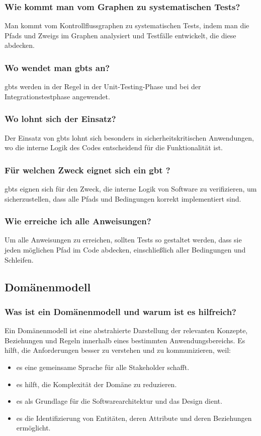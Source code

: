 \documentclass[main.tex]{subfiles}
\begin{document}
\subsubsection*{Wie kommt man vom Graphen zu systematischen Tests?}
Man kommt vom Kontrollflussgraphen zu systematischen Tests, indem man die \glspl{Pfad} und \glspl{Zweig} im Graphen analysiert und Testfälle entwickelt, die diese abdecken.


\subsubsection*{Wo wendet man \glspl{gbt}  an?}
\glspl{gbt}  werden in der Regel in der Unit-Testing-Phase und bei der Integrationstestphase angewendet.


\subsubsection*{Wo lohnt sich der Einsatz?}
Der Einsatz von \glspl{gbt}  lohnt sich besonders in sicherheitskritischen Anwendungen, wo die interne Logik des Codes entscheidend für die Funktionalität ist.


\subsubsection*{Für welchen Zweck eignet sich ein \gls{gbt} ?}
\glspl{gbt}  eignen sich für den Zweck, die interne Logik von Software zu verifizieren, um sicherzustellen, dass alle \glspl{Pfad} und Bedingungen korrekt implementiert sind.


\subsubsection*{Wie erreiche ich alle Anweisungen?}
Um alle Anweisungen zu erreichen, sollten Tests so gestaltet werden, dass sie jeden möglichen \gls{Pfad} im Code abdecken, einschließlich aller Bedingungen und Schleifen.


\subsection{\gls{Domänenmodell}}
\subsubsection*{Was ist ein \gls{Domänenmodell} und warum ist es hilfreich?}
Ein \gls{Domänenmodell} ist eine abstrahierte Darstellung der relevanten Konzepte, Beziehungen und Regeln innerhalb eines bestimmten Anwendungsbereichs. Es hilft, die Anforderungen besser zu verstehen und zu kommunizieren, weil:
\begin{itemize}
    \item es eine gemeinsame Sprache für alle Stakeholder schafft.
    \item es hilft, die Komplexität der Domäne zu reduzieren.
    \item es als Grundlage für die Softwarearchitektur und das Design dient.
    \item es die Identifizierung von Entitäten, deren Attribute und deren Beziehungen ermöglicht.
\end{itemize}
\end{document}
